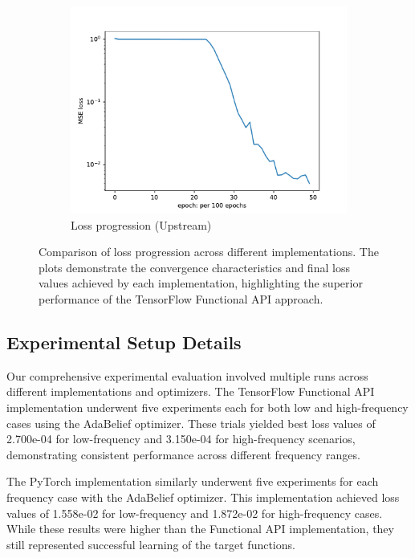 \documentclass[10pt,journal,compsoc,onecolumn]{IEEEtran}
\begin{document}
\begin{figure}[htbp]
    \begin{subfigure}[b]{0.3\textwidth}
        \includegraphics[width=\textwidth]{../../results/upstream/low-frequency-adabelief-20250206-1105-1/loss}
        \caption{Loss progression (Upstream)}
        \label{fig:loss_upstream}
    \end{subfigure}
    \caption{Comparison of loss progression across different implementations. The plots demonstrate the convergence characteristics and final loss values achieved by each implementation, highlighting the superior performance of the TensorFlow Functional API approach.}
    \label{fig:loss_comparison}
\end{figure}

\subsection{Experimental Setup Details}
Our comprehensive experimental evaluation involved multiple runs across different implementations and optimizers. The TensorFlow Functional API implementation underwent five experiments each for both low and high-frequency cases using the AdaBelief optimizer. These trials yielded best loss values of 2.700e-04 for low-frequency and 3.150e-04 for high-frequency scenarios, demonstrating consistent performance across different frequency ranges.

The PyTorch implementation similarly underwent five experiments for each frequency case with the AdaBelief optimizer. This implementation achieved loss values of 1.558e-02 for low-frequency and 1.872e-02 for high-frequency cases. While these results were higher than the Functional API implementation, they still represented successful learning of the target functions.
\end{document}
